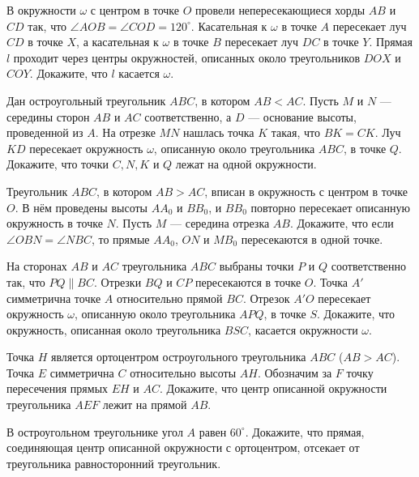 \documentclass{article}
\begin{document}
\begin{enumerate_boxed}
        \item В окружности $\omega$ с центром в точке $O$ провели непересекающиеся хорды $AB$ и $CD$ так, что $\angle AOB = \angle COD = 120^\circ$.
        Касательная к $\omega$ в точке $A$ пересекает луч $CD$ в точке $X$, а касательная к $\omega$ в точке $B$ пересекает луч $DC$ в точке $Y$.
        Прямая $l$ проходит через центры окружностей, описанных около треугольников $DOX$ и $COY$.
        Докажите, что $l$ касается $\omega$.

        \item Дан остроугольный треугольник $ABC$, в котором $AB < AC$.
        Пусть $M$ и $N$ — середины сторон $AB$ и $AC$ соответственно, а $D$ — основание высоты, проведенной из $A$.
        На отрезке $MN$ нашлась точка $K$ такая, что $BK = CK$.
        Луч $KD$ пересекает окружность $\omega$, описанную около треугольника $ABC$, в точке $Q$.
        Докажите, что точки $C, N, K$ и $Q$ лежат на одной окружности.

        \item Треугольник $ABC$, в котором $AB > AC$, вписан в окружность с центром в точке $O$.
        В нём проведены высоты $AA_0$ и $BB_0$, и $BB_0$ повторно пересекает описанную окружность в точке $N$.
        Пусть $M$ — середина отрезка $AB$.
        Докажите, что если $\angle OBN = \angle NBC$, то прямые $AA_0$, $ON$ и $MB_0$ пересекаются в одной точке.

        \item На сторонах $AB$ и $AC$ треугольника $ABC$ выбраны точки $P$ и $Q$ соответственно так, что $PQ \parallel BC$.
        Отрезки $BQ$ и $CP$ пересекаются в точке $O$.
        Точка $A'$ симметрична точке $A$ относительно прямой $BC$.
        Отрезок $A'O$ пересекает окружность $\omega$, описанную около треугольника $APQ$, в точке $S$.
        Докажите, что окружность, описанная около треугольника $BSC$, касается окружности $\omega$.

        \item Точка $H$ является ортоцентром остроугольного треугольника $ABC$ ($AB> AC$). Точка $E$ симметрична $C$ относительно высоты $AH$.
        Обозначим за $F$ точку пересечения прямых $EH$ и $AC$.
        Докажите, что центр описанной окружности треугольника $AEF$ лежит на прямой $AB$.

        \item В остроугольном треугольнике угол $A$ равен $60^\circ$.
        Докажите, что прямая, соединяющая центр описанной окружности с ортоцентром, отсекает от треугольника равносторонний треугольник.


\end{enumerate_boxed}
\end{document}
